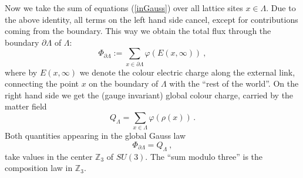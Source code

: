 \documentclass[a4paper,12pt]{article}
\begin{document}
Now we take the sum of equations (\ref{inGauss}) over all lattice
sites $x \in \Lambda$. Due to the above identity, all terms on the
left hand side cancel, except for contributions coming from the
boundary. This way we obtain the total flux through the boundary
$\partial \Lambda$ of $\Lambda$:
\begin{equation}\label{flux}
  \Phi_{\partial \Lambda} := \sum_{x \in \partial \Lambda}
  \varphi(E(x,\infty )) \ ,
\end{equation}
where by $E(x,\infty )$ we denote the colour electric charge along
the external link, connecting the point $x$ on the boundary of
$\Lambda$ with the ``rest of the world''. On the right hand side
we get the (gauge invariant) global colour charge, carried by the
matter field
\begin{equation}
\label{globalM} Q_{\Lambda} = \sum_{x \in \Lambda}
\varphi(\rho(x)) \, .
\end{equation}
Both quantities appearing in the global Gauss law
\begin{equation}\label{gG}
  \Phi_{\partial \Lambda} = Q_{\Lambda} \ ,
\end{equation}
take values in the center ${\mathbb Z}_3$ of $SU(3)$. The ``sum
modulo three'' is the composition law in ${\mathbb Z}_3$.
\end{document}
